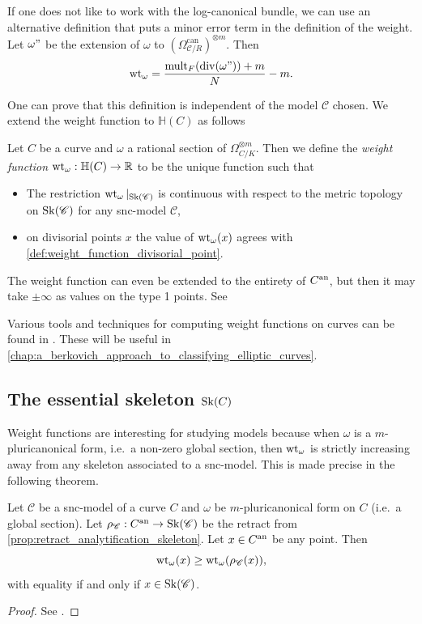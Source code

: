 \begin{remark}
	If one does not like to work with the log-canonical bundle, we can use an alternative definition that puts a minor error term in the definition of the weight. 
	Let $\omega"$ be the extension of $\omega$ to $(\Omega_{\mathscr C / R}^{\text{can}})^{\otimes m}$. Then \[
		\operatorname{wt}_{\omega} = \frac{\operatorname{mult}_F(\operatorname{div} (\omega")) + m}{N} - m
	.\] 
\end{remark}
One can prove that this definition is independent of the model $\mathscr C$ chosen. 
We extend the weight function to $\mathbb{H}(C)$ as follows 
\begin{definition}\label{def:weight_function}
	Let $C$ be a curve and $\omega$ a rational section of $\Omega_{C / K}^{\otimes m}$. 
	Then we define the \emph{weight function} $\operatorname{wt}_{\omega}: \mathbb{H}(C) \to \mathbb{R}$ to be the unique function such that 
	\begin{itemize}
		\item The restriction $\operatorname{wt}_{\omega}|_{\operatorname{Sk}(\mathscr C)}$ is continuous with respect to the metric topology on $\operatorname{Sk}(\mathscr C)$ for any snc-model $\mathscr C$, 
		\item on divisorial points $x$ the value of $\operatorname{wt}_{\omega}(x)$ agrees with \cref{def:weight_function_divisorial_point}.
	\end{itemize}
\end{definition}

The weight function can even be extended to the entirety of $C{}^{\text{an}}$, but then it may take $\pm \infty$ as values on the type 1 points. See \cite[§4.5.4]{mustataWeightFunctionsNonArchimedean2015}


Various tools and techniques for computing weight functions on curves can be found in \cite{bakerWeightFunctionsBerkovich2016}. 
These will be useful in \cref{chap:a_berkovich_approach_to_classifying_elliptic_curves}. 

\subsection{The essential skeleton $\sk(C)$}\label{sec:the_essential_skeleton_sk_c$}

Weight functions are interesting for studying models because when $\omega$ is a $m$-pluricanonical form, i.e.\ a non-zero global section, then $\operatorname{wt}_\omega$ is strictly increasing away from any skeleton associated to a snc-model. 
This is made precise in the following theorem. 
\begin{proposition}\label{prop:weight_function_increase}
	Let $\mathscr C$ be a snc-model of a curve $C$ and $\omega$ be $m$-pluricanonical form on $C$ (i.e.\ a global section).
	Let $\rho_{\mathscr C}: C{}^{\text{an}} \to \operatorname{Sk}(\mathscr C)$ be the retract from \cref{prop:retract_analytification_skeleton}. 
	Let $x \in C{}^{\text{an}} $ be any point. 
	Then \[
		\operatorname{wt}_\omega(x) \ge \operatorname{wt}_\omega(\rho_{\mathscr C}(x))
	,\] 
	with equality if and only if $x \in \operatorname{Sk}(\mathscr C)$. 
\end{proposition}
\begin{proof}
	See \cite[prop.\ 4.4.4]{mustataWeightFunctionsNonArchimedean2015}. 
\end{proof}

